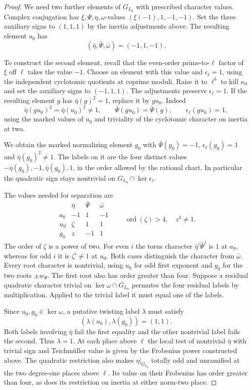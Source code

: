 \begin{proof}
We need two further elements of \(G_{L_0}\) with prescribed character values.
Complex conjugation has \(\xi,\Psi,\eta,\omega\)-values
\((\xi(-1),1,-1,-1)\). Set the three auxiliary signs
to \((1,1,1)\) by the inertia adjustments above.
The resulting element \(a_0\) has
\[
 (\bar\eta,\bar\Psi,\bar\omega)=(-1,1,-1).
\]

To construct the second element, recall that the even-order prime-to-\(\ell\)
factor of \(\xi\) off \(\ell\) takes the value \(-1\).
Choose an element with this value and
\(\epsilon_\ell=1\), using the independent cyclotomic
quotients at coprime moduli. Raise it to \(\ell^b\)
to kill \(\kappa_0\) and set the auxiliary signs to
\((-1,1,1)\). The adjustments preserve
\(\epsilon_\ell=1\). If the resulting element \(g\) has \(\bar\eta(g)^2=1\), replace it by \(gu_0\). Indeed
\[
 \bar\eta(gu_0)^2=\bar\eta(u_0)^2\ne1,\qquad
 \bar\Psi(gu_0)=\bar\Psi(g),\qquad \epsilon_\ell(gu_0)=1 ,
\]
using the marked values of \(u_0\) and triviality of the cyclotomic character on inertia at two.

We obtain the marked normalizing element \(g_0\)
with \(\bar\Psi(g_0)=-1\), \(\epsilon_\ell(g_0)=1\) and
\(\bar\eta(g_0)^2\ne1\). The labels on it are the
four distinct values \(-\bar\eta(g_0),-1,\bar\eta(g_0),1\),
in the order allowed by the rational chart. In
particular the quadratic sign stays nontrivial on
\(G_{L_0}\cap\ker\epsilon_\ell\).

The values needed for separation are
\[
 \begin{array}{c|ccc}
       &\bar\eta &\bar\Psi &\bar\omega\\ \hline
 a_0   &-1 &1 &-1\\
 u_0   &\zeta &1 &1\\
 g_0   &z &-1 &1
 \end{array}
 \qquad \operatorname{ord}(\zeta)>4,\quad z^2\ne1.
\]
The order of \(\zeta\) is a power of two. For even \(i\)
the torus character \(\bar\eta^i\bar\Psi^j\) is \(1\) at
\(a_0\), whereas for odd \(i\) it is \(\zeta^i\ne1\) at
\(u_0\). Both cases distinguish the character from \(\bar\omega\). Every root character
is nontrivial, using \(u_0\) for odd first exponent
and \(g_0\) for the two roots \(\pm w_\Psi\).
The first root also has order greater than four.
Suppose a residual quadratic character trivial on
\(\ker\omega\cap G_{L_0}\) permutes the four residual
labels by multiplication. Applied to the trivial
label it must equal one of the labels.

Since \(u_0,g_0\in\ker\omega\), a putative twisting label \(\lambda\) must satisfy
\[
 (\lambda(u_0),\lambda(g_0))=(1,1).
\]
Both labels involving \(\bar\eta\) fail the first equality and the other nontrivial label fails the second. Thus \(\lambda=1\). At each place above \(\ell\) the local
test of nontrivial \(\bar\eta\) with trivial sign and
Teichm\"uller value is given by the Frobenius power
constructed above. The quadratic restriction also
makes \(\eta|_{G_{k_0}}\) totally odd and unramified
at the two degree-one places above \(\ell\). Its
value on their Frobenius has order greater than
four, as does its restriction on inertia at either
norm-two place.

\end{proof}

